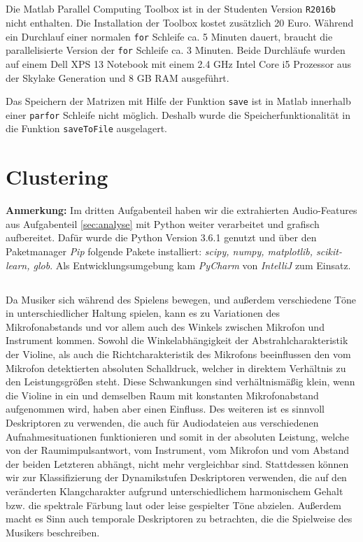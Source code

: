 \subsection{}
Die Matlab Parallel Computing Toolbox ist in der Studenten Version \texttt{R2016b} nicht enthalten.
Die Installation der Toolbox kostet zusätzlich 20 Euro.
Während ein Durchlauf einer normalen \texttt{for} Schleife ca. 5 Minuten dauert, braucht die parallelisierte Version der \texttt{for} Schleife ca. 3 Minuten.
Beide Durchläufe wurden auf einem Dell XPS 13 Notebook mit einem 2.4 GHz Intel Core i5 Prozessor aus der Skylake Generation und 8 GB RAM ausgeführt.

Das Speichern der Matrizen mit Hilfe der Funktion \texttt{save} ist in Matlab innerhalb einer \texttt{parfor} Schleife nicht möglich.
Deshalb wurde die Speicherfunktionalität in die Funktion \texttt{saveToFile} ausgelagert.

\newpage

\section{Clustering}
\label{sec:cluster}

\textbf{Anmerkung:} Im dritten Aufgabenteil haben wir die extrahierten Audio-Features aus Aufgabenteil \ref{sec:analyse} mit Python weiter verarbeitet und grafisch aufbereitet.
Dafür wurde die Python Version 3.6.1 genutzt und über den Paketmanager \textit{Pip} folgende Pakete installiert: \textit{scipy, numpy, matplotlib, scikit-learn, glob}.
Als Entwicklungsumgebung kam \textit{PyCharm} von \textit{IntelliJ} zum Einsatz.

\subsection{}
\label{ssec:3a}
Da Musiker sich während des Spielens bewegen, und außerdem verschiedene Töne in unterschiedlicher Haltung spielen, kann es zu Variationen des Mikrofonabstands und vor allem auch des Winkels zwischen Mikrofon und Instrument kommen. 
Sowohl die Winkelabhängigkeit der Abstrahlcharakteristik der Violine, als auch die Richtcharakteristik des Mikrofons beeinflussen den vom Mikrofon detektierten absoluten Schalldruck, welcher in direktem Verhältnis zu den Leistungsgrößen steht. 
Diese Schwankungen sind verhältnismäßig klein, wenn die Violine in ein und demselben Raum mit konstanten Mikrofonabstand aufgenommen wird, haben aber einen Einfluss.
Des weiteren ist es sinnvoll Deskriptoren zu verwenden, die auch für Audiodateien aus verschiedenen Aufnahmesituationen funktionieren und somit in der absoluten Leistung, welche von der Raumimpulsantwort, vom Instrument, vom Mikrofon und vom Abstand der beiden Letzteren abhängt, nicht mehr vergleichbar sind.
Stattdessen können wir zur Klassifizierung der Dynamikstufen Deskriptoren verwenden, die auf den veränderten Klangcharakter aufgrund unterschiedlichem harmonischem Gehalt bzw. die spektrale Färbung laut oder leise gespielter Töne abzielen.
Außerdem macht es Sinn auch temporale Deskriptoren zu betrachten, die die Spielweise des Musikers beschreiben.
